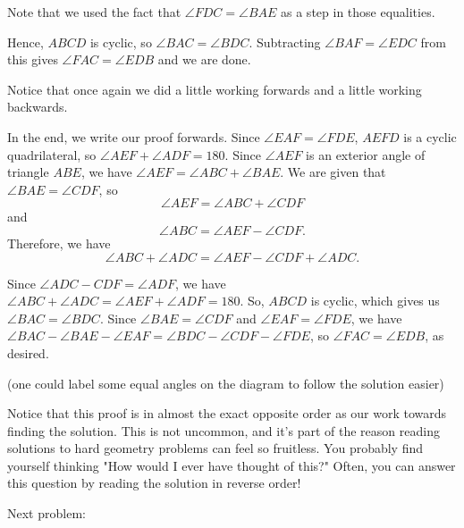 Note that we used the fact that $\angle FDC = \angle BAE$ as a step in those equalities.

Hence, $ABCD$ is cyclic, so $\angle BAC = \angle BDC.$ Subtracting $\angle BAF = \angle EDC$ from this gives $\angle FAC = \angle EDB$ and we are done.



Notice that once again we did a little working forwards and a little working backwards.

In the end, we write our proof forwards. Since $\angle EAF = \angle FDE$, $AEFD$ is a cyclic quadrilateral, so $\angle AEF + \angle ADF = 180$. Since $\angle AEF$ is an exterior angle of triangle $ABE$, we have $\angle AEF = \angle ABC + \angle BAE$. We are given that $\angle BAE = \angle CDF$, so $$ \angle AEF = \angle ABC + \angle CDF$$ and $$ \angle ABC = \angle AEF - \angle CDF. $$Therefore, we have $$ \angle ABC + \angle ADC = \angle AEF - \angle CDF + \angle ADC. $$

Since $\angle ADC -  CDF = \angle ADF$, we have $\angle ABC + \angle ADC = \angle AEF + \angle ADF = 180$. So, $ABCD$ is cyclic, which gives us $\angle BAC = \angle BDC.$ Since $\angle BAE = \angle CDF$ and $\angle EAF = \angle FDE$, we have $\angle BAC - \angle BAE - \angle EAF = \angle BDC - \angle CDF - \angle FDE$, so $\angle FAC = \angle EDB$, as desired.

(one could label some equal angles on the diagram to follow the solution easier)

Notice that this proof is in almost the exact opposite order as our work towards finding the solution. This is not uncommon, and it's part of the reason reading solutions to hard geometry problems can feel so fruitless. You probably find yourself thinking "How would I ever have thought of this?" Often, you can answer this question by reading the solution in reverse order!

Next problem:

